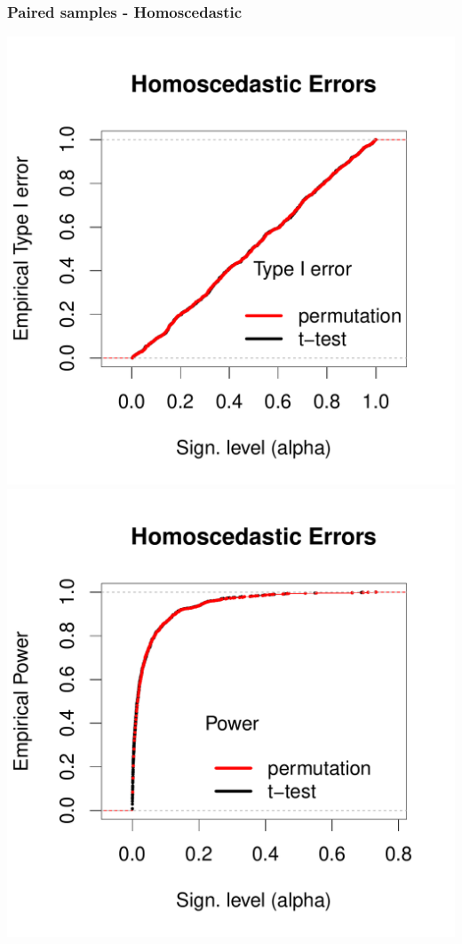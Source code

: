 \documentclass[xcolor={pdftex,dvipsnames,table}]{beamer}
\begin{document}
\begin{frame}[fragile]
\frametitle{Paired samples - Homoscedastic}
\includegraphics[scale=.3]{figures_perm_covariates/simTypeIHomo}
\includegraphics[scale=.3]{figures_perm_covariates/simPowerHomo}
\end{frame}
\end{document}
